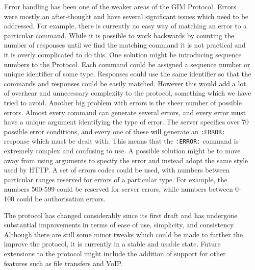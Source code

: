 Error handling has been one of the weaker areas of the GIM Protocol. Errors were mostly an after-thought and have several significant issues which need to be addressed. For example, there is currently no easy way of matching an error to a particular command. While it is possible to work backwards by counting the number of responses until we find the matching command it is not practical and it is overly complicated to do this. One solution might be introducing sequence numbers to the Protocol. Each command could be assigned a sequence number or unique identifier of some type. Responses could use the same identifier so that the commands and responses could be easily matched. However this would add a lot of overhear and unnecessary complexity to the protocol, something which we have tried to avoid. Another big problem with errors is the sheer number of possible errors. Almost every command can generate several errors, and every error must have a unique argument identifying the type of error. The server specifies over 70 possible error conditions, and every one of these will generate an \texttt{:ERROR:} response which must be dealt with. This means that the \texttt{:ERROR:} command is extremely complex and confusing to use. A possible solution might be to move away from using arguments to specify the error and instead adopt the same style used by HTTP. A set of errors codes could be used, with numbers between particular ranges reserved for errors of a particular type. For example, the numbers 500-599 could be reserved for server errors, while numbers between 0-100 could be authorisation errors.

The protocol has changed considerably since its first draft and has undergone substantial improvements in terms of ease of use, simplicity, and consistency. Although there are still some minor tweaks which could be made to further the improve the protocol, it is currently in a stable and usable state. Future extensions to the protocol might include the addition of support for other features such as file transfers and VoIP.
